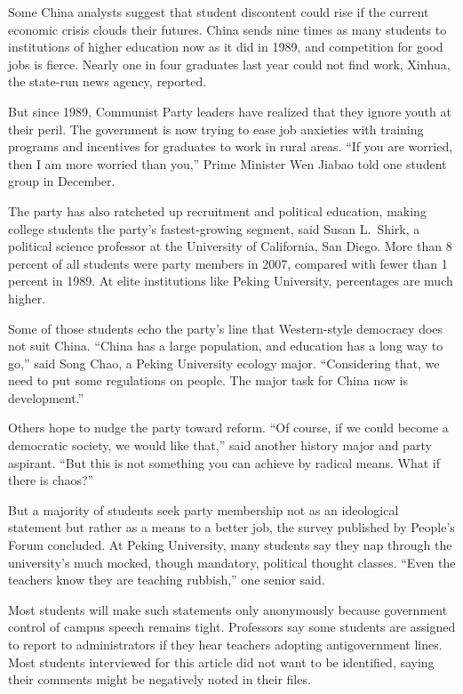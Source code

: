 \documentclass[12pt,a4paper,onecolumn]{article}
\begin{document}
Some China analysts suggest that student discontent could rise if the current economic crisis clouds
their futures. China sends nine times as many students to institutions of higher education now as it
did in 1989, and competition for good jobs is fierce. Nearly one in four graduates last year could
not find work, Xinhua, the state-run news agency, reported.

But since 1989, Communist Party leaders have realized that they ignore youth at their peril. The
government is now trying to ease job anxieties with training programs and incentives for graduates
to work in rural areas. ``If you are worried, then I am more worried than you,'' Prime Minister Wen
Jiabao told one student group in December.

The party has also ratcheted up recruitment and political education, making college students the
party's fastest-growing segment, said Susan L.~Shirk, a political science professor at the
University of California, San Diego. More than 8 percent of all students were party members in 2007,
compared with fewer than 1 percent in 1989. At elite institutions like Peking University,
percentages are much higher.

Some of those students echo the party's line that Western-style democracy does not suit China.
``China has a large population, and education has a long way to go,'' said Song Chao, a Peking
University ecology major. ``Considering that, we need to put some regulations on people. The major
task for China now is development.''

Others hope to nudge the party toward reform. ``Of course, if we could become a democratic society,
we would like that,'' said another history major and party aspirant. ``But this is not something you
can achieve by radical means. What if there is chaos?''

But a majority of students seek party membership not as an ideological statement but rather as a
means to a better job, the survey published by People's Forum concluded. At Peking University, many
students say they nap through the university's much mocked, though mandatory, political thought
classes. ``Even the teachers know they are teaching rubbish,'' one senior said.

Most students will make such statements only anonymously because government control of campus speech
remains tight. Professors say some students are assigned to report to administrators if they hear
teachers adopting antigovernment lines. Most students interviewed for this article did not want to
be identified, saying their comments might be negatively noted in their files.
\end{document}
